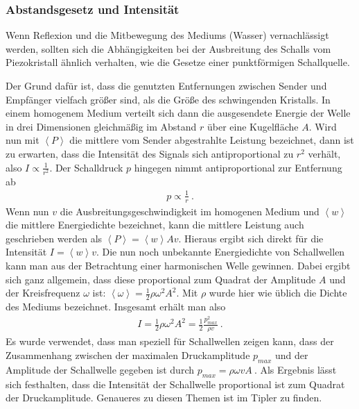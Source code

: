 \documentclass[12pt,a4paper,titlepage,headinclude,bibtotoc]{scrartcl}
\numberwithin{equation}{subsection}
\begin{document}
\subsubsection{Abstandsgesetz und Intensität}
\label{sec:abs}
Wenn Reflexion und die Mitbewegung des Mediums (Wasser) vernachlässigt werden, sollten sich die Abhängigkeiten bei der Ausbreitung des Schalls vom Piezokristall ähnlich verhalten, wie die Gesetze einer punktförmigen Schallquelle.

Der Grund dafür ist, dass die genutzten Entfernungen zwischen Sender und Empfänger vielfach größer sind, als die Größe des schwingenden Kristalls. 
In einem homogenem Medium verteilt sich dann die ausgesendete Energie der Welle in drei Dimensionen gleichmäßig im Abstand $r$ über eine Kugelfläche $A$.
Wird nun mit $\left<P\right>$ die mittlere vom Sender abgestrahlte Leistung 
bezeichnet, dann ist zu erwarten, dass die Intensität des Signals sich antiproportional zu $r^2$ verhält, also $I \propto \frac{1}{r^2}$.
Der Schalldruck $p$ hingegen nimmt antiproportional zur Entfernung ab
\begin{align}
 p \propto \frac{1}{r}~.
\end{align}
Wenn nun $v$ die Ausbreitungsgeschwindigkeit im homogenen Medium und $\left<w\right>$ die mittlere Energiedichte bezeichnet, kann die mittlere Leistung auch geschrieben werden als $\left<P\right>  = \left<w\right> A v$.
Hieraus ergibt sich direkt für die Intensität $I = \left<w\right> v$.
Die nun noch unbekannte Energiedichte von Schallwellen kann man aus der Betrachtung einer harmonischen Welle gewinnen. Dabei ergibt sich ganz allgemein, dass diese 
proportional zum Quadrat der Amplitude $A$ und der Kreisfrequenz $\omega$ ist: $\left<\omega\right> = \frac{1}{2} \rho \omega^2 A^2$.
Mit $\rho$ wurde hier wie üblich die Dichte des Mediums bezeichnet.
Insgesamt erhält man also
\begin{align}
 I = \frac{1}{2} \rho \omega^2 A^2 = \frac{1}{2} \frac{p_{max}^2}{\rho v}~.
\end{align}
Es wurde verwendet, dass man speziell für Schallwellen zeigen kann, dass der Zusammenhang zwischen der maximalen Druckamplitude $p_{max}$ und der Amplitude der Schallwelle gegeben ist durch $p_{max} = \rho \omega v A~. $
Als Ergebnis lässt sich festhalten, dass die Intensität der Schallwelle proportional ist zum Quadrat der Druckamplitude. Genaueres zu diesen Themen ist im Tipler \cite[S.598]{tipler} zu finden.
\end{document}
